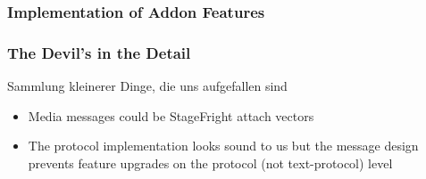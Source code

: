 \documentclass[
	aspectratio=169,
	xetex,
]{beamer}
\newcounter{i}
\begin{document}
\begin{frame}[t]
	\frametitle{Implementation of Addon Features}

		
\end{frame}



\begin{frame}
	\frametitle{The Devil's in the Detail}
	Sammlung kleinerer Dinge, die uns aufgefallen sind
	\begin{itemize}
		\item Media messages could be StageFright attach vectors
		\item The protocol implementation looks sound to us but the message design prevents feature upgrades on the protocol (not text-protocol) level

	\end{itemize}
\end{frame}
\end{document}
